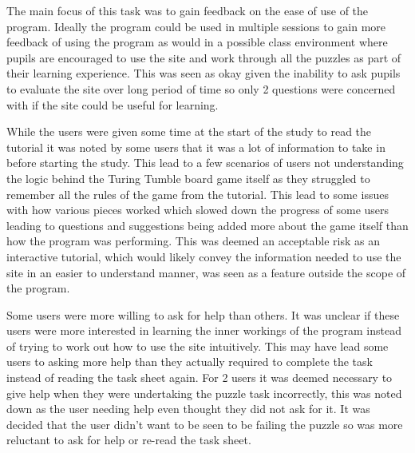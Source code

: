 \documentclass{l4proj}
\begin{document}
The main focus of this task was to gain feedback on the ease of use of the program. Ideally the program could be used in multiple sessions to gain more feedback of using the program as would in a possible class environment where pupils are encouraged to use the site and work through all the puzzles as part of their learning experience. This was seen as okay given the inability to ask pupils to evaluate the site over long period of time so only 2 questions were concerned with if the site could be useful for learning. 

While the users were given some time at the start of the study to read the tutorial it was noted by some users that it was a lot of information to take in before starting the study. This lead to a few scenarios of users not understanding the logic behind the Turing Tumble board game itself as they struggled to remember all the rules of the game from the tutorial. This lead to some issues with how various pieces worked which slowed down the progress of some users leading to questions and suggestions being added more about the game itself than how the program was performing. This was deemed an acceptable risk as an interactive tutorial, which would likely convey the information needed to use the site in an easier to understand manner, was seen as a feature outside the scope of the program. 

Some users were more willing to ask for help than others. It was unclear if these users were more interested in learning the inner workings of the program instead of trying to work out how to use the site intuitively. This may have lead some users to asking more help than they actually required to complete the task instead of reading the task sheet again. For 2 users it was deemed necessary to give help when they were undertaking the puzzle task incorrectly, this was noted down as the user needing help even thought they did not ask for it. It was decided that the user didn't want to be seen to be failing the puzzle so was more reluctant to ask for help or re-read the task sheet.  
\end{document}
